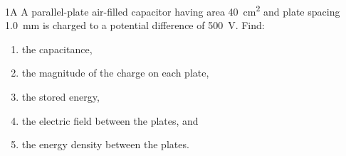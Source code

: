 \newcommand{\NoteType}{Assignment 2}
\newcommand{\CourseName}{Electromagnetism \& Electronics}
\newcommand{\CourseNumber}{290231U007}


  
  \newpage

  \begin{problem}{1A}
    A parallel-plate air-filled capacitor having area \qty{40}{\cm^2} and plate spacing \qty{1,0}{\mm} is charged to a potential difference of \qty{500}{\V}.
    Find:
    \begin{enumerate}[label=(\alph*)]
      \item the capacitance,
      \item the magnitude of the charge on each plate,
      \item the stored energy,
      \item the electric field between the plates, and
      \item the energy density between the plates.
    \end{enumerate}
  \end{problem}


